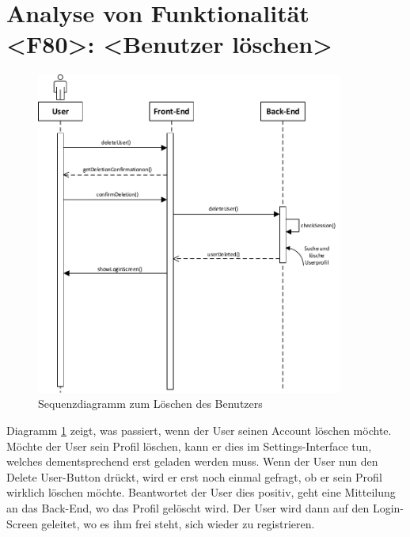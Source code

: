 \section{Analyse von Funktionalität <F80>: <Benutzer löschen>} 
\begin{figure}[h]
\centering
\includegraphics[width=0.9\textwidth]{figures/sequenz_F80.pdf}
\caption{Sequenzdiagramm zum Löschen des Benutzers}
\label{sequence_f80}
\end{figure}
Diagramm \ref{sequence_f80} zeigt, was passiert, wenn der User seinen Account löschen möchte.
Möchte der User sein Profil löschen, kann er dies im Settings-Interface tun, welches dementsprechend erst geladen werden muss. Wenn der User nun den \glqq Delete User\grqq -Button drückt, wird er erst noch einmal gefragt, ob er sein Profil wirklich löschen möchte. Beantwortet der User dies positiv, geht eine Mitteilung an das Back-End, wo das Profil gelöscht wird. Der User wird dann auf den Login-Screen geleitet, wo es ihm frei steht, sich wieder zu registrieren.

\newpage
